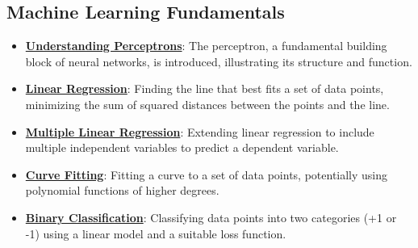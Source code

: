\documentclass{article}%
\begin{document}
\subsection{Machine Learning Fundamentals}%
\label{subsec:MachineLearningFundamentals}%
\begin{itemize}[leftmargin=*]%
\item \href{https://purdue.brightspace.com/d2l/common/assets/pdfjs-d2l-dist/1.0.14-legacy/web/viewer.html?file=\%2Fcontent\%2Fenforced\%2F1095467-wl.202510.CS.24300.001\%2F04L1-Linear Algebra Primer.pdf\%3Fou\%3D1095467\&lang=en-us\&container=d2l-fileviewer-rendered-pdf\&fullscreen=d2l-fileviewer-rendered-pdf-dialog\&height=667#page=17}{\textbf{Understanding Perceptrons}}: The perceptron, a fundamental building block of neural networks, is introduced, illustrating its structure and function.%
\item \href{https://purdue.brightspace.com/d2l/common/assets/pdfjs-d2l-dist/1.0.14-legacy/web/viewer.html?file=\%2Fcontent\%2Fenforced\%2F1095467-wl.202510.CS.24300.001\%2F05L2-ML Basics.pdf\%3Fou\%3D1095467\&lang=en-us\&container=d2l-fileviewer-rendered-pdf\&fullscreen=d2l-fileviewer-rendered-pdf-dialog\&height=667#page=6}{\textbf{Linear Regression}}: Finding the line that best fits a set of data points, minimizing the sum of squared distances between the points and the line.%
\item \href{https://purdue.brightspace.com/d2l/common/assets/pdfjs-d2l-dist/1.0.14-legacy/web/viewer.html?file=\%2Fcontent\%2Fenforced\%2F1095467-wl.202510.CS.24300.001\%2F05L2-ML Basics.pdf\%3Fou\%3D1095467\&lang=en-us\&container=d2l-fileviewer-rendered-pdf\&fullscreen=d2l-fileviewer-rendered-pdf-dialog\&height=667#page=11}{\textbf{Multiple Linear Regression}}: Extending linear regression to include multiple independent variables to predict a dependent variable.%
\item \href{https://purdue.brightspace.com/d2l/common/assets/pdfjs-d2l-dist/1.0.14-legacy/web/viewer.html?file=\%2Fcontent\%2Fenforced\%2F1095467-wl.202510.CS.24300.001\%2F05L2-ML Basics.pdf\%3Fou\%3D1095467\&lang=en-us\&container=d2l-fileviewer-rendered-pdf\&fullscreen=d2l-fileviewer-rendered-pdf-dialog\&height=667#page=13}{\textbf{Curve Fitting}}: Fitting a curve to a set of data points, potentially using polynomial functions of higher degrees.%
\item \href{https://purdue.brightspace.com/d2l/common/assets/pdfjs-d2l-dist/1.0.14-legacy/web/viewer.html?file=\%2Fcontent\%2Fenforced\%2F1095467-wl.202510.CS.24300.001\%2F05L2-ML Basics.pdf\%3Fou\%3D1095467\&lang=en-us\&container=d2l-fileviewer-rendered-pdf\&fullscreen=d2l-fileviewer-rendered-pdf-dialog\&height=667#page=20}{\textbf{Binary Classification}}: Classifying data points into two categories (+1 or {-}1) using a linear model and a suitable loss function.%

\end{itemize}
\end{document}
